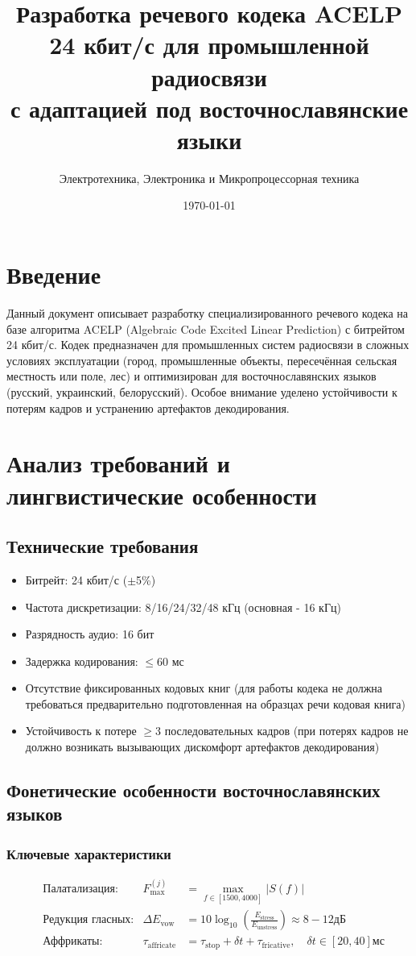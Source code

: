 \documentclass{report}
\title{Разработка речевого кодека ACELP 24 кбит/с для промышленной радиосвязи\\ с адаптацией под восточнославянские языки}
\author{Электротехника, Электроника и Микропроцессорная техника}
\date{\today}
\begin{document}
	
	\maketitle
	
	\tableofcontents
	
	\chapter*{Введение}
	Данный документ описывает разработку специализированного речевого кодека на базе алгоритма ACELP (Algebraic Code Excited Linear Prediction) с битрейтом 24 кбит/с. Кодек предназначен для промышленных систем радиосвязи в сложных условиях эксплуатации (город, промышленные объекты, пересечённая сельская местность или поле, лес) и оптимизирован для восточнославянских языков (русский, украинский, белорусский). Особое внимание уделено устойчивости к потерям кадров и устранению артефактов декодирования.
	
	\chapter{Анализ требований и лингвистические особенности}
	\section{Технические требования}
	\begin{itemize}
		\item Битрейт: 24 кбит/с ($\pm$5\%)
		\item Частота дискретизации: 8/16/24/32/48 кГц (основная - 16 кГц)
		\item Разрядность аудио: 16 бит
		\item Задержка кодирования: $\leqslant$60 мс
		\item Отсутствие фиксированных кодовых книг (для работы кодека не должна требоваться предварительно подготовленная на образцах речи кодовая книга)
		\item Устойчивость к потере $\geqslant$3 последовательных кадров (при потерях кадров не должно возникать вызывающих дискомфорт артефактов декодирования)
	\end{itemize}
	
	\section{Фонетические особенности восточнославянских языков}
	\subsection{Ключевые характеристики}
	\begin{align}
		&\text{Палатализация:} & F_{\text{max}}^{(j)} &= \max_{f \in [1500,4000]} |S(f)| \\
		&\text{Редукция гласных:} & \Delta E_{\text{vow}} &= 10 \log_{10} \left( \frac{E_{\text{stress}}}{E_{\text{unstress}}} \right) \approx 8-12 \text{дБ} \\
		&\text{Аффрикаты:} & \tau_{\text{affricate}} &= \tau_{\text{stop}} + \delta t + \tau_{\text{fricative}}, \quad \delta t \in [20,40] \text{мс}
	\end{align}
	
\end{document}
